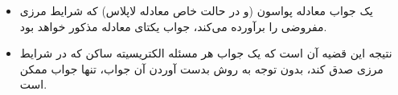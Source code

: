 \ELhold


\begin{ELunit}


\begin{itemize}
\tightlist
\item
  یک جواب معادله پواسون (و در حالت خاص معادله لاپلاس) که شرایط مرزی مفروضی را برآورده می‌کند، جواب یکتای معادله مذکور خواهد بود.
\item
  نتیجه این قضیه آن است که یک جواب هر مسئله الکتریسیته ساکن که در شرایط مرزی صدق کند، بدون توجه به روش بدست آوردن آن جواب، تنها جواب ممکن است.
\end{itemize}

\end{ELunit}

\ELhold


